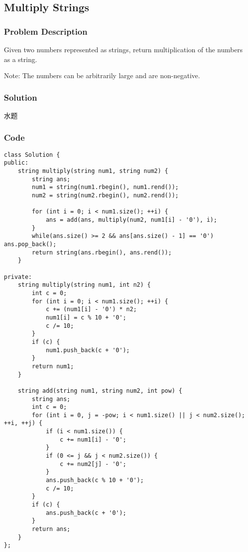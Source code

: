 \documentclass[courier]{article}
\begin{document}
\begin{CJK*}{UTF8}{gkai}
\subsection{ Multiply Strings }

\subsubsection*{Problem Description}
Given two numbers represented as strings, return multiplication of the numbers as a string.

Note: The numbers can be arbitrarily large and are non-negative.



\subsubsection*{Solution}
水题

\subsubsection*{Code}
\begin{lstlisting}
class Solution {
public:
    string multiply(string num1, string num2) {
        string ans;
        num1 = string(num1.rbegin(), num1.rend());
        num2 = string(num2.rbegin(), num2.rend());
        
        for (int i = 0; i < num1.size(); ++i) {
            ans = add(ans, multiply(num2, num1[i] - '0'), i);
        }
        while(ans.size() >= 2 && ans[ans.size() - 1] == '0') ans.pop_back();
        return string(ans.rbegin(), ans.rend());
    }
    
private:
    string multiply(string num1, int n2) {
        int c = 0;
        for (int i = 0; i < num1.size(); ++i) {
            c += (num1[i] - '0') * n2;
            num1[i] = c % 10 + '0';
            c /= 10;
        }
        if (c) {
            num1.push_back(c + '0');
        }
        return num1;
    }
    
    string add(string num1, string num2, int pow) {
        string ans;
        int c = 0;
        for (int i = 0, j = -pow; i < num1.size() || j < num2.size(); ++i, ++j) {
            if (i < num1.size()) {
                c += num1[i] - '0';
            }
            if (0 <= j && j < num2.size()) {
                c += num2[j] - '0';
            }
            ans.push_back(c % 10 + '0');
            c /= 10;
        }
        if (c) {
            ans.push_back(c + '0');
        }
        return ans;
    }
};



\end{lstlisting}
\end{CJK*}
\end{document}
